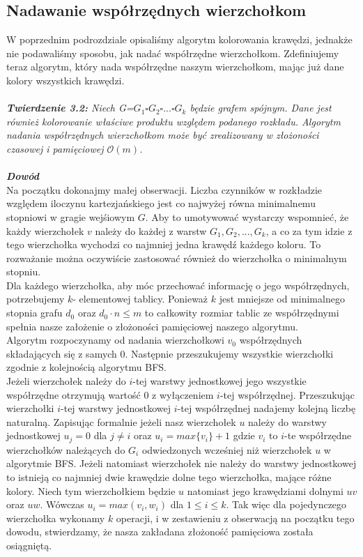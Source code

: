 \documentclass[12pt,a4paper,titlepage]{article}
\begin{document}
\subsection{Nadawanie współrzędnych wierzchołkom}
W poprzednim podrozdziale opisaliśmy algorytm kolorowania krawędzi, jednakże nie podawaliśmy sposobu, jak nadać współrzędne wierzchołkom. Zdefiniujemy teraz algorytm, który nada współrzędne naszym wierzchołkom, mając już dane kolory wszystkich krawędzi.\\
\\
\textit{\textbf{Twierdzenie 3.2:} Niech G=$G_1 \square G_2 \square ... \square G_k$ będzie grafem spójnym. Dane jest również kolorowanie właściwe produktu względem podanego rozkładu. Algorytm nadania współrzędnych wierzchołkom może być zrealizowany w złożoności czasowej i pamięciowej $\mathcal{O}(m)$.}\\
\\
\textit{\textbf{Dowód}}\\
Na początku dokonajmy małej obserwacji. Liczba czynników w rozkładzie względem iloczynu kartezjańskiego jest co najwyżej równa minimalnemu stopniowi w gragie wejśiowym $G$. Aby to umotywować wystarczy wspomnieć, że każdy wierzchołek $v$ należy do każdej z warstw $G_1, G_2, ..., G_k$, a co za tym idzie z tego wierzchołka wychodzi co najmniej jedna krawędź każdego koloru. To rozważanie można oczywiście zastosować również do wierzchołka o minimalnym stopniu.\\
Dla każdego wierzchołka, aby móc przechować informację o jego współrzędnych, potrzebujemy $k$- elementowej tablicy. Ponieważ $k$ jest mniejsze od minimalnego stopnia grafu $d_0$ oraz $d_0 \cdot n \leqslant m$ to całkowity rozmiar tablic ze współrzędnymi spełnia nasze założenie o złożoności pamięciowej naszego algorytmu.\\
Algorytm rozpoczynamy od nadania wierzchołkowi $v_0$ współrzędnych składających się z samych 0. Następnie przeszukujemy wszystkie wierzchołki zgodnie z kolejnością algorytmu BFS. \\Jeżeli wierzchołek należy do $i$-tej warstwy jednostkowej jego wszystkie współrzędne otrzymują wartość 0 z wyłączeniem $i$-tej współrzędnej. Przeszukując wierzchołki $i$-tej warstwy jednostkowej $i$-tej współrzędnej nadajemy kolejną liczbę naturalną. Zapisując formalnie jeżeli nasz wierzchołek $u$ należy do warstwy jednostkowej $u_j =0$ dla $j \neq i$
oraz $u_i = max\{v_i\}+1$ gdzie $v_i $ to $i$-te współrzędne wierzchołków należących do $G_i$ odwiedzonych wcześniej niż wierzchołek $u$ w algorytmie BFS. 
Jeżeli natomiast wierzchołek nie należy do warstwy jednostkowej to istnieją co najmniej dwie krawędzie dolne tego wierzchołka, mające różne kolory. Niech tym wierzchołkiem będzie $u$ natomiast jego krawędziami dolnymi $uv$ oraz $uw$. Wówczas $u_i = max(v_i , w_i )$ dla $1 \leqslant i \leqslant k$. Tak więc dla pojedynczego wierzchołka wykonamy $k$ operacji, i w zestawieniu z obserwacją na początku tego dowodu, stwierdzamy, że nasza zakładana złożoność pamięciowa została osiągniętą.
\newpage
\end{document}
